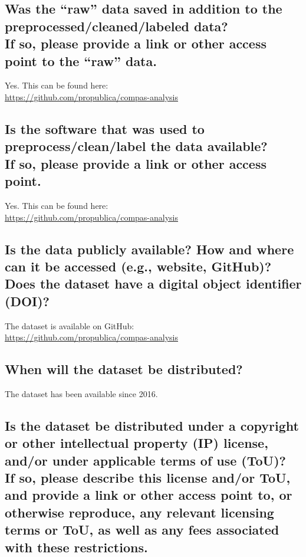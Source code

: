 \documentclass[letterpaper, 10 pt, conference]{ieeeconf}  %
\newcommand{\subtitle}[1]{{\\ \small \normalfont \color{purple} #1}}
\begin{document}
\subsection{Was the “raw” data saved in addition to the preprocessed/cleaned/labeled data? \subtitle{If so, please provide a link or other access point to the “raw” data. }}

Yes. This can be found here: \\ \href{https://github.com/propublica/compas-analysis}{https://github.com/propublica/compas-analysis}

\subsection{Is the software that was used to preprocess/clean/label the data available? \subtitle{If so, please provide a link or other access point.}}

Yes. This can be found here: \\
\href{https://github.com/propublica/compas-analysis}{https://github.com/propublica/compas-analysis}

\subsection{Is the data publicly available? How and where can it be accessed (e.g., website, GitHub)? \subtitle{Does the dataset have a digital object identifier (DOI)?}}

The dataset is available on GitHub: \\ \href{https://github.com/propublica/compas-analysis}{https://github.com/propublica/compas-analysis}

\subsection{When will the dataset be distributed?}

The dataset has been available since 2016.

\subsection{Is the dataset be distributed under a copyright or other intellectual property (IP) license, and/or under applicable terms of use (ToU)? \subtitle{If so, please describe this license and/or ToU, and provide a link or other access point to, or otherwise reproduce, any relevant licensing terms or ToU, as well as any fees associated with these restrictions.}}
\end{document}
